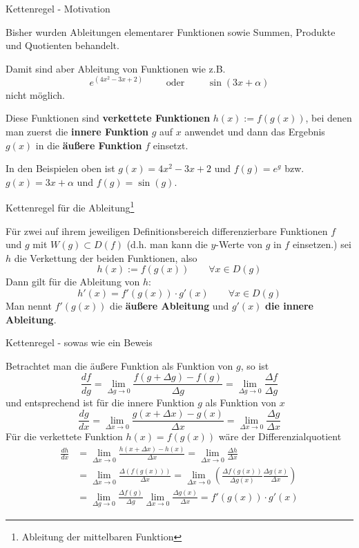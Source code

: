 \begin{frame}{Kettenregel - Motivation}
	\begin{bemerkung}
		Bisher wurden Ableitungen elementarer Funktionen sowie Summen, Produkte und Quotienten behandelt.
		
		Damit sind aber Ableitung von Funktionen wie z.B. 
		\[
			e^{(4x^{2}-3x+2)} \qquad \text{ oder }\qquad \sin (3x+\alpha)
		\]
		nicht möglich.
		
		Diese Funktionen sind \textbf{verkettete Funktionen} $h(x):=f(g(x))$, bei denen man zuerst die \textbf{innere Funktion} $g$ auf $x$ anwendet und dann das Ergebnis $g(x)$ in die \textbf{äußere Funktion} $f$ einsetzt.
		
		In den Beispielen oben ist $g(x)=4x^{2}-3x+2$ und $f(g)=e^{g}$ bzw. $g(x)=3x+\alpha$ und $f(g)=\sin (g)$.
	\end{bemerkung}
\end{frame}

\begin{frame}{Kettenregel für die Ableitung\footnote{Ableitung der mittelbaren Funktion}}
	\begin{theorem}
		Für zwei auf ihrem jeweiligen Definitionsbereich differenzierbare Funktionen $f$ und $g$ mit $W(g) \subset D(f)$ (d.h. man kann die $y$-Werte von $g$ in $f$ einsetzen.) sei $h$ die Verkettung der beiden Funktionen, also
		\[
			h(x):= f(g(x)) \qquad \forall x \in D(g)
		\]
		Dann gilt für die Ableitung von $h$:
		\[
			h'(x)=f'(g(x)) \cdot g'(x) \qquad \forall x \in D(g)
		\]
		Man nennt $f'(g(x))$ die \textbf{äußere Ableitung} und $g'(x)$ \textbf{die innere Ableitung}.
	\end{theorem}
\end{frame}

\begin{frame}{Kettenregel - sowas wie ein Beweis}

{\small 	\begin{bemerkung}
				Betrachtet man die äußere Funktion als Funktion von $g$, so ist
				\[
				\frac{df}{dg} = \lim_{\Delta g \to 0} \frac{f(g+\Delta g)-f(g)}{\Delta g} = \lim_{\Delta g \to 0} \frac{\Delta f}{\Delta g}
				\]	
				und entsprechend ist für die innere Funktion $g$ als Funktion von $x$
				\[
				\frac{dg}{dx} = \lim_{\Delta x \to 0} \frac{g(x+\Delta x)-g(x)}{\Delta x} = \lim_{\Delta x \to 0} \frac{\Delta g}{\Delta x}
				\]	
		Für die verkettete Funktion $h(x)=f(g(x))$ wäre der Differenzialquotient
		\begin{align*}
			\frac{dh}{dx} & = \lim_{\Delta x \to 0} \frac{h(x+\Delta x)-h(x)}{\Delta x} = \lim_{\Delta x \to 0} \frac{\Delta h}{\Delta x} \\
			& = \lim_{\Delta x \to 0} \frac{\Delta (f(g(x)))}{\Delta x} = \lim_{\Delta x \to 0 } \left( \frac{\Delta f(g(x))}{\Delta g(x)} \frac{\Delta g(x)}{\Delta x} \right)  \\
			& = \lim_{\Delta g \to 0 } \frac{\Delta f(g)}{\Delta g} \lim_{\Delta x \to 0 } \frac{\Delta g(x)}{\Delta x} = f'(g(x))\cdot g'(x)
		\end{align*}		
		\end{bemerkung}
}\end{frame}

